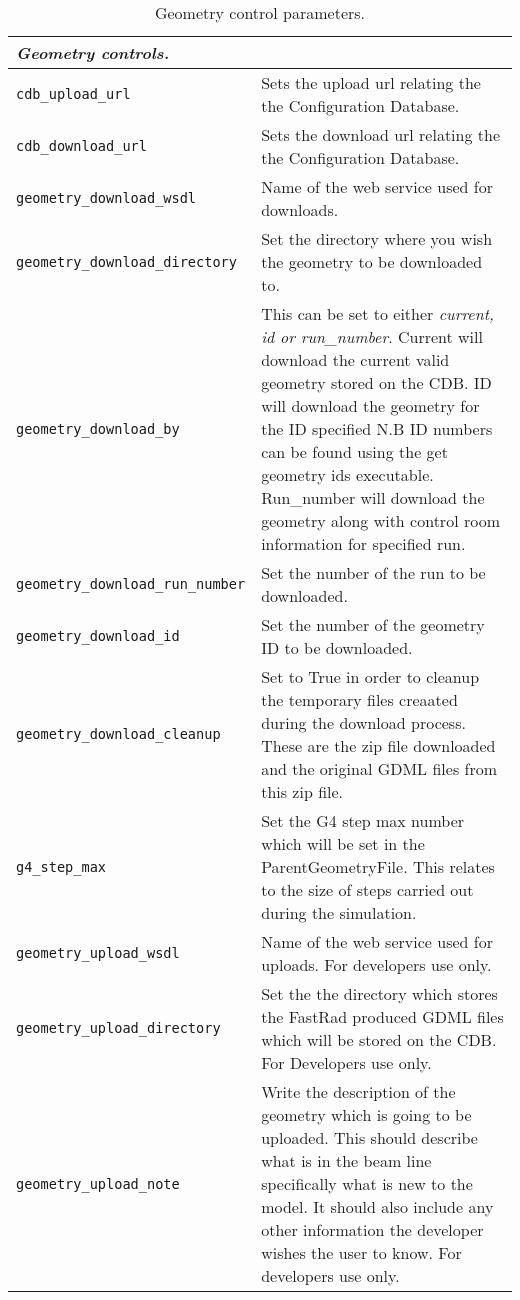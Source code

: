 \begin{table*}
\begin{center}
\caption{Geometry control parameters.}
\begin{tabularx}{\textwidth}{lX}
\hline
\multicolumn{2}{l}{\emph{Geometry controls.}} \\
\hline
\verb|cdb_upload_url| & Sets the upload url relating the the Configuration Database.\\
\verb|cdb_download_url| & Sets the download url relating the the Configuration Database.\\
\verb|geometry_download_wsdl| & Name of the web service used for downloads.\\
\verb|geometry_download_directory| & Set the directory where you wish the geometry to be downloaded to.\\
\verb|geometry_download_by| & This can be set to either \textit{current, id or run\_number}. Current will download the current valid geometry stored
on the CDB. ID will download the geometry for the ID specified N.B ID numbers can be found using the get geometry ids executable. Run\_number will
download the geometry along with control room information for specified run. \\ 
\verb|geometry_download_run_number| & Set the number of the run to be downloaded.\\
\verb|geometry_download_id| & Set the number of the geometry ID to be downloaded.\\
\verb|geometry_download_cleanup| & Set to True in order to cleanup the temporary files creaated during the download process. These are the zip file
downloaded and the original GDML files from this zip file.\\
\verb|g4_step_max| & Set the G4 step max number which will be set in the ParentGeometryFile. This relates to the size of steps carried out during
the simulation.\\
\verb|geometry_upload_wsdl| & Name of the web service used for uploads. For developers use only.\\
\verb|geometry_upload_directory| & Set the the directory which stores the FastRad produced GDML files which will be stored on the CDB. For Developers
use only.\\
\verb|geometry_upload_note| & Write the description of the geometry which is going to be uploaded. This should describe what is in the beam line
specifically what is new to the model. It should also include any other information the developer wishes the user to know. For developers use only.\\

\end{tabularx}
\end{center}
\end{table*}
